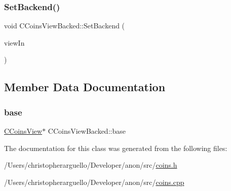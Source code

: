 \subsubsection{\texorpdfstring{Set\+Backend()}{SetBackend()}}
{\footnotesize\ttfamily void C\+Coins\+View\+Backed\+::\+Set\+Backend (\begin{DoxyParamCaption}\item[{\mbox{\hyperlink{class_c_coins_view}{C\+Coins\+View}} \&}]{view\+In }\end{DoxyParamCaption})}



\subsection{Member Data Documentation}
\mbox{\label{class_c_coins_view_backed_a901472317114adc4c104efd61dcf6203}} 
\subsubsection{\texorpdfstring{base}{base}}
{\footnotesize\ttfamily \mbox{\hyperlink{class_c_coins_view}{C\+Coins\+View}}$\ast$ C\+Coins\+View\+Backed\+::base\hspace{0.3cm}{\ttfamily [protected]}}



The documentation for this class was generated from the following files\+:\begin{DoxyCompactItemize}
\item 
/\+Users/christopherarguello/\+Developer/anon/src/\mbox{\hyperlink{coins_8h}{coins.\+h}}\item 
/\+Users/christopherarguello/\+Developer/anon/src/\mbox{\hyperlink{coins_8cpp}{coins.\+cpp}}\end{DoxyCompactItemize}
